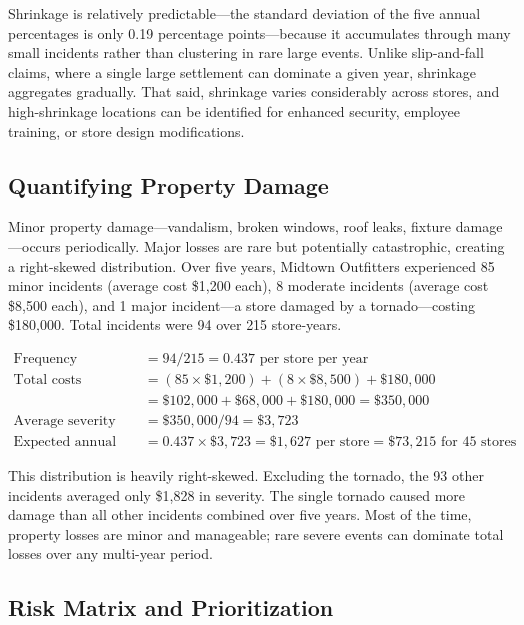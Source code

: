 \documentclass[11pt,openany]{book}
\begin{document}
Shrinkage is relatively predictable---the standard deviation of the five annual
percentages is only 0.19 percentage points---because it accumulates through
many small incidents rather than clustering in rare large events. Unlike
slip-and-fall claims, where a single large settlement can dominate a given year,
shrinkage aggregates gradually. That said, shrinkage varies considerably across
stores, and high-shrinkage locations can be identified for enhanced security,
employee training, or store design modifications.

\subsection{Quantifying Property Damage}
\label{subsec:midtown-property}

Minor property damage---vandalism, broken windows, roof leaks, fixture
damage---occurs periodically. Major losses are rare but potentially
catastrophic, creating a right-skewed distribution. Over five years, Midtown
Outfitters experienced 85 minor incidents (average cost \$1,200 each), 8
moderate incidents (average cost \$8,500 each), and 1 major incident---a store
damaged by a tornado---costing \$180,000. Total incidents were 94 over 215
store-years.

\begin{align*}
  \text{Frequency} &= 94 / 215 = 0.437 \text{ per store per year}\\
  \text{Total costs} &= (85 \times \$1{,}200) + (8 \times \$8{,}500) + \$180{,}000\\
                     &= \$102{,}000 + \$68{,}000 + \$180{,}000 = \$350{,}000\\
  \text{Average severity} &= \$350{,}000 / 94 = \$3{,}723\\
  \text{Expected annual loss} &= 0.437 \times \$3{,}723 = \$1{,}627 \text{ per store}
                                 = \$73{,}215 \text{ for 45 stores}
\end{align*}

This distribution is heavily right-skewed. Excluding the tornado, the 93 other
incidents averaged only \$1,828 in severity. The single tornado caused more
damage than all other incidents combined over five years. Most of the time,
property losses are minor and manageable; rare severe events can dominate total
losses over any multi-year period.

\subsection{Risk Matrix and Prioritization}
\label{subsec:midtown-matrix}
\end{document}
